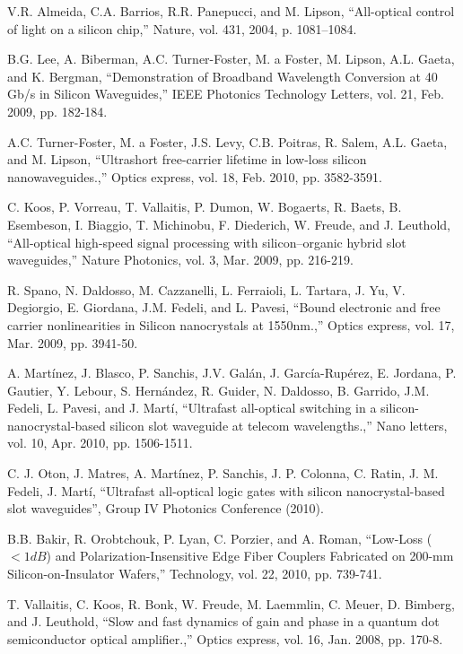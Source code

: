\documentclass[conference]{IEEEtran}
\begin{document}
\begin{thebibliography}{99}

V.R. Almeida, C.A. Barrios, R.R. Panepucci, and M. Lipson, “All-optical control of light on a silicon chip,” Nature, vol. 431, 2004, p. 1081–1084.

B.G. Lee, A. Biberman, A.C. Turner-Foster, M. a Foster, M. Lipson, A.L. Gaeta, and K. Bergman, “Demonstration of Broadband Wavelength Conversion at 40 Gb/s in Silicon Waveguides,” IEEE Photonics Technology Letters, vol. 21, Feb. 2009, pp. 182-184.

A.C. Turner-Foster, M. a Foster, J.S. Levy, C.B. Poitras, R. Salem, A.L. Gaeta, and M. Lipson, “Ultrashort free-carrier lifetime in low-loss silicon nanowaveguides.,” Optics express, vol. 18, Feb. 2010, pp. 3582-3591.

C. Koos, P. Vorreau, T. Vallaitis, P. Dumon, W. Bogaerts, R. Baets, B. Esembeson, I. Biaggio, T. Michinobu, F. Diederich, W. Freude, and J. Leuthold, “All-optical high-speed signal processing with silicon–organic hybrid slot waveguides,” Nature Photonics, vol. 3, Mar. 2009, pp. 216-219.

R. Spano, N. Daldosso, M. Cazzanelli, L. Ferraioli, L. Tartara, J. Yu, V. Degiorgio, E. Giordana, J.M. Fedeli, and L. Pavesi, “Bound electronic and free carrier nonlinearities in Silicon nanocrystals at 1550nm.,” Optics express, vol. 17, Mar. 2009, pp. 3941-50.

A. Mart\'inez, J. Blasco, P. Sanchis, J.V. Gal\'an, J. Garc\'ia-Rup\'erez, E. Jordana, P. Gautier, Y. Lebour, S. Hern\'andez, R. Guider, N. Daldosso, B. Garrido, J.M. Fedeli, L. Pavesi, and J. Mart\'i, “Ultrafast all-optical switching in a silicon-nanocrystal-based silicon slot waveguide at telecom wavelengths.,” Nano letters, vol. 10, Apr. 2010, pp. 1506-1511.

C. J. Oton, J. Matres, A. Mart\'inez, P. Sanchis, J. P. Colonna, C. Ratin, J. M. Fedeli, J. Mart\'i, “Ultrafast all-optical logic gates with silicon nanocrystal-based slot waveguides”, Group IV Photonics Conference (2010).

 B.B. Bakir, R. Orobtchouk, P. Lyan, C. Porzier, and A. Roman, “Low-Loss ( $< 1 dB$) and Polarization-Insensitive Edge Fiber Couplers Fabricated on 200-mm Silicon-on-Insulator Wafers,” Technology, vol. 22, 2010, pp. 739-741.

T. Vallaitis, C. Koos, R. Bonk, W. Freude, M. Laemmlin, C. Meuer, D. Bimberg, and J. Leuthold, “Slow and fast dynamics of gain and phase in a quantum dot semiconductor optical amplifier.,” Optics express, vol. 16, Jan. 2008, pp. 170-8.


\end{thebibliography}
\end{document}
